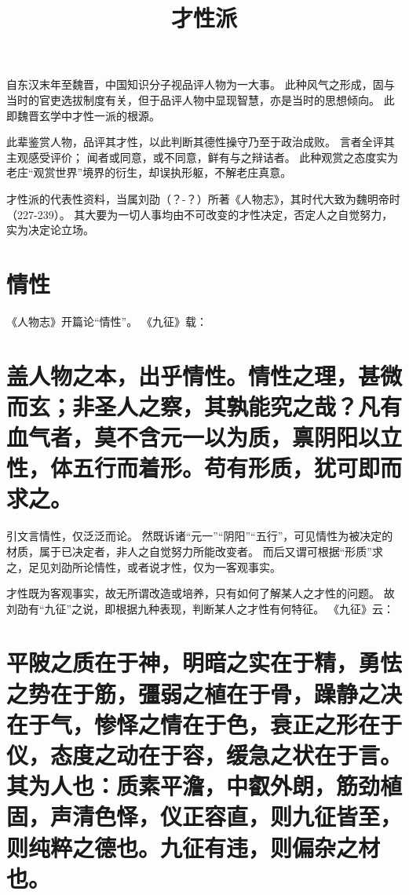\documentclass[11pt]{article}
\title{才性派}
\date{}
\begin{document}
  \maketitle

  \linenumbers

自东汉末年至魏晋，中国知识分子视品评人物为一大事。
此种风气之形成，固与当时的官吏选拔制度有关，但于品评人物中显现智慧，亦是当时的思想倾向。
此即魏晋玄学中才性一派的根源。

\newline

此辈鉴赏人物，品评其才性，以此判断其德性操守乃至于政治成败。
言者全评其主观感受评价；
闻者或同意，或不同意，鲜有与之辩诘者。
此种观赏之态度实为老庄“观赏世界”境界的衍生，却误执形躯，不解老庄真意。

\newline

才性派的代表性资料，当属刘劭（？-？）所著《人物志》，其时代大致为魏明帝时（227-239）。
其大要为一切人事均由不可改变的才性决定，否定人之自觉努力，实为决定论立场。

\section{情性}
《人物志》开篇论“情性”。
《九征》载：

\section{盖人物之本，出乎情性。情性之理，甚微而玄；非圣人之察，其孰能究之哉？凡有血气者，莫不含元一以为质，禀阴阳以立性，体五行而着形。苟有形质，犹可即而求之。}


引文言情性，仅泛泛而论。
然既诉诸“元一”“阴阳”“五行”，可见情性为被决定的材质，属于已决定者，非人之自觉努力所能改变者。
而后又谓可根据“形质”求之，足见刘劭所论情性，或者说才性，仅为一客观事实。

\newline

才性既为客观事实，故无所谓改造或培养，只有如何了解某人之才性的问题。
故刘劭有“九征”之说，即根据九种表现，判断某人之才性有何特征。
《九征》云：

\section{平陂之质在于神，明暗之实在于精，勇怯之势在于筋，彊弱之植在于骨，躁静之决在于气，惨怿之情在于色，衰正之形在于仪，态度之动在于容，缓急之状在于言。其为人也：质素平澹，中叡外朗，筋劲植固，声清色怿，仪正容直，则九征皆至，则纯粹之德也。九征有违，则偏杂之材也。}
\end{document}
